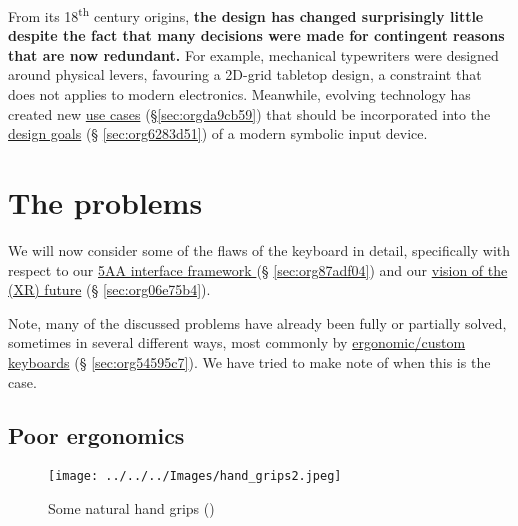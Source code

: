 \documentclass[logo,bsc,singlespacing,parskip]{infthesis}
\begin{document}
From its 18\textsuperscript{th} century origins, \textbf{the design has changed surprisingly little despite the fact that many decisions were made for contingent reasons that are now redundant.}
For example, mechanical typewriters were designed around physical levers, favouring a 2D-grid tabletop design, a constraint that does not applies to modern electronics.
Meanwhile, evolving technology has created new \hyperref[sec:orgda9cb59]{use cases} (\S \ref{sec:orgda9cb59}) that should be incorporated into the \hyperref[sec:org6283d51]{design goals} (§ \ref{sec:org6283d51}) of a modern symbolic input device.
\section{The problems}
\label{sec:org56dbdfe}
We will now consider some of the flaws of the keyboard in detail, specifically with respect to our  \hyperref[sec:org87adf04]{5AA interface framework } (§ \ref{sec:org87adf04}) and our \hyperref[sec:org06e75b4]{vision of the (XR) future} (§ \ref{sec:org06e75b4}).

Note, many of the discussed problems have already been fully or partially solved, sometimes in several different ways, most commonly by \hyperref[sec:org54595c7]{ergonomic/custom keyboards} (§ \ref{sec:org54595c7}).
We have tried to make note of when this is the case.
\subsection{Poor ergonomics}
\label{sec:org88f9eb0}
\begin{figure}[h]
\centering
\texttt{[image: ../../../Images/hand\_grips2.jpeg]}
\caption{\label{fig:hand_grips}Some natural hand grips (\autocite{victorBriefRantFuture})}
\end{figure}
\end{document}

